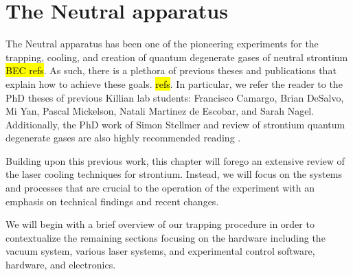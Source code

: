 \chapter{The Neutral apparatus}
\label{ch:chap2}

The Neutral apparatus has been one of the pioneering experiments for the trapping, cooling, and creation of quantum degenerate gases of neutral strontium \hl{BEC refs}. 
As such, there is a plethora of previous theses and publications that explain how to achieve these goals. \hl{refs}. 
In particular, we refer the reader to the PhD theses of previous Killian lab students: Francisco Camargo, Brian DeSalvo, Mi Yan, Pascal Mickelson, Natali Martinez de Escobar, and Sarah Nagel. 
Additionally, the PhD work of Simon Stellmer \cite{SimonStellmer2013} and review of strontium quantum degenerate gases are also highly recommended reading \cite{StellmerRev2013}.

Building upon this previous work, this chapter will forego an extensive review of the laser cooling techniques for strontium. 
Instead, we will focus on the systems and processes that are crucial to the operation of the experiment with an emphasis on technical findings and recent changes.


We will begin with a brief overview of our trapping procedure in order to contextualize the remaining sections focusing on the hardware including the vacuum system, various laser systems, and experimental control software, hardware, and electronics.


